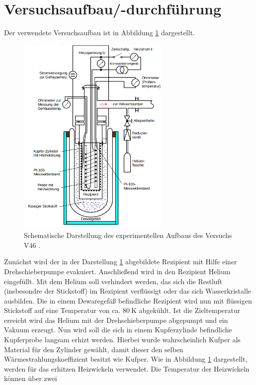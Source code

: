 \section{Versuchsaufbau/-durchführung}
Der verwendete Versuchsaufbau ist in Abbildung \ref{fig: aufbau} dargestellt.
\begin{figure}
  \centering
  \includegraphics[width = 0.65\textwidth]{./content/images/aufbau.png}
  \caption{Schematische Darstellung des experimentellen Aufbaus des Versuchs V46  \cite{anleitungV47}.}
  \label{fig: aufbau}
\end{figure}
Zunächst wird der in der Darstellung \ref{fig: aufbau} abgebildete Rezipient
mit Hilfe einer Drehschieberpumpe evakuiert. Anschließend wird in den Rezipient
Helium eingefüllt. Mit dem Helium soll verhindert werden, das sich die Restluft
(insbesondre der Stickstoff) im Rezipient verflüssigt oder das sich Wasserkristalle
ausbilden. Die in einem Dewaregefäß befindliche Rezipient wird nun mit flüssigen
Stickstoff auf eine Temperatur von ca. $\SI{80}{\kelvin}$ abgekühlt. Ist die
Zieltemperatur erreicht wird das Helium mit der Drehschieberpumpe abgepumpt und
ein Vakuum erzeugt. Nun wird soll die sich in einem Kupferzylinde befindliche
Kupferprobe langsam erhizt werden. Hierbei wurde wahrscheinlich Kufper als Material
für den Zylinder gewählt, damit dieser den selben Wärmestrahlungskoeffizient besitzt
wie Kufper. Wie in Abbildung \ref{fig: aufbau} dargestellt, werden für das erhitzen
Heizwickeln verwendet. Die Temperatur der Heizwickeln können über zwei
